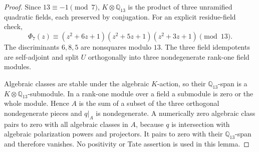 \documentclass[11pt]{article}
\theoremstyle{remark}\newtheorem{remark}[theorem]{Remark}
\begin{document}
\begin{proof}
Since \(13\equiv-1\pmod7\), \(K\otimes\mathbb Q_{13}\) is the product
of three unramified quadratic fields, each preserved by conjugation.
For an explicit residue-field check,
\[
 \Phi_7(z)\equiv
 (z^2+6z+1)(z^2+5z+1)(z^2+3z+1)\pmod {13}.
\]
The discriminants \(6,8,5\) are nonsquares modulo \(13\).
The three field idempotents are self-adjoint and split \(U\)
orthogonally into three nondegenerate rank-one field modules.

Algebraic classes are stable under the algebraic \(K\)-action, so
their \(\mathbb Q_{13}\)-span is a \(K\otimes\mathbb Q_{13}\)-submodule.
In a rank-one module over a field a submodule is zero or the whole
module. Hence \(A\) is the sum of a subset of the three orthogonal
nondegenerate pieces and \(q|_A\) is nondegenerate.
A numerically zero algebraic class pairs to zero with all algebraic
classes in \(A\), because \(q\) is intersection with algebraic
polarization powers and projectors. It pairs to zero with their
\(\mathbb Q_{13}\)-span and therefore vanishes. No positivity or
Tate assertion is used in this lemma.
\end{proof}
\end{document}
